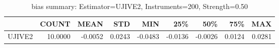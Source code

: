 \begin{table}[ht]
\centering
\caption{bias summary: Estimator=UJIVE2, Instruments=200, Strength=0.50}
\begin{tabular}{lrrrrrrrr}
\toprule
 & COUNT & MEAN & STD & MIN & 25\% & 50\% & 75\% & MAX \\
\midrule
UJIVE2 & 10.0000 & -0.0052 & 0.0243 & -0.0483 & -0.0136 & -0.0026 & 0.0124 & 0.0281 \\
\bottomrule
\end{tabular}
\end{table}
